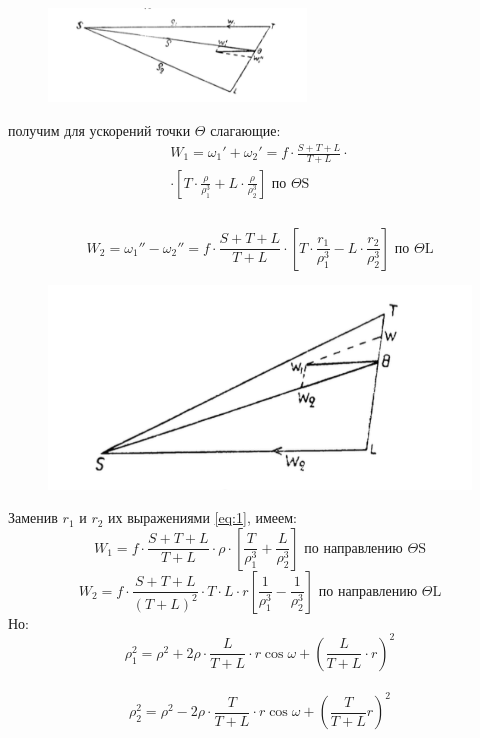\documentclass[a4paper,12pt]{article}
\begin{document}
\begin{figure}
    \includegraphics[width=\linewidth, height=2.5cm]{22.png}
	\caption{}\label{22}
\end{figure}\noindent получим для ускорений точки $\Theta$ слагающие:
\begin{multline}
    W_1 = \omega_{1}' + \omega_{2}' = f \cdot \frac{S+T+L}{T+L}\cdot \\
    \cdot \left[T \cdot \frac{\rho}{\rho_1^3}+L \cdot \frac{\rho}{\rho_2^3} \right] \mbox{ по $\Theta$S} \\    
\end{multline} \\

\begin{equation*}
 W_2 = \omega_{1}'' - \omega_{2}'' = f \cdot \frac{S+T+L}{T+L}\cdot \left[T \cdot \frac{r_1}{\rho_1^3}-L \cdot \frac{r_2}{\rho_2^3} \right] \mbox{ по $\Theta$L}   
\end{equation*}

\begin{figure}[bhtp]
\centering
\includegraphics{23.png}
\caption{}\label{23}
\end{figure}

Заменив $r_1$ и $r_2$ их выражениями \eqref{eq:1}, имеем:
\[ W_1 = f \cdot \frac{S+T+L}{T+L} \cdot \rho \cdot \left[ \frac{T}{\rho_1^3} + \frac{L}{\rho_2^3} \right] \mbox{ по направлению $\Theta$S} \] 
\[ W_2 = f \cdot \frac{S+T+L}{\left(T+L\right)^2} \cdot T \cdot L \cdot r  \left[ \frac{1}{\rho_1^3} - \frac{1}{\rho_2^3} \right] \mbox{ по направлению $\Theta$L} \]
\noindent Но:
\[ \rho_1^2 = \rho^2 + 2\rho \cdot \frac{L}{T+L} \cdot r \cos{\omega} + \left(\frac{L}{T+L} \cdot r \right)^2 \] \\
\[ \rho_2^2 = \rho^2 - 2\rho \cdot \frac{T}{T+L} \cdot r \cos{\omega} + \left(\frac{T}{T+L} r \right)^2 \]
\end{document}
